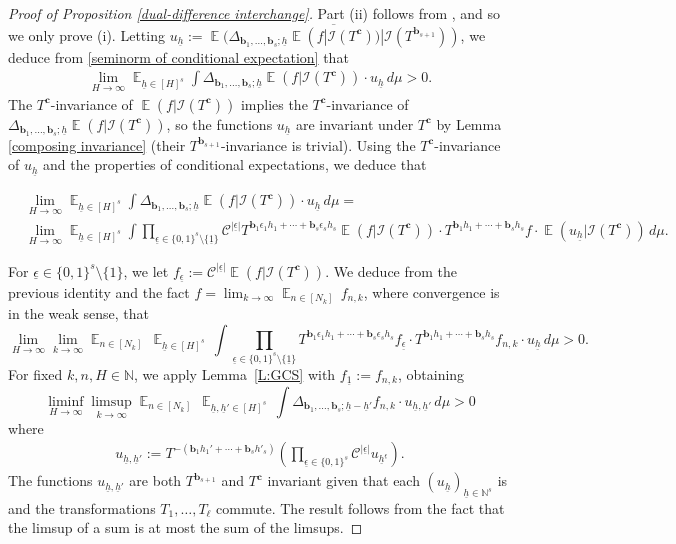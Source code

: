 \documentclass[11pt]{amsart}
\theoremstyle{definition}
\newcommand{\N}{{\mathbb N}}
\newcommand{\CC}{{\mathcal C}}
\newcommand{\CI}{{\mathcal I}}
\newcommand{\bc}{{\mathbf{c}}}
\renewcommand{\b}{{\textbf{b}}}
\newcommand{\uh}{{\underline{h}}}
\newcommand{\eps}{\epsilon}
\newcommand{\ueps}{{\underline{\epsilon}}}
\DeclareMathOperator*{\E}{\mathbb{E}}
\begin{document}
\begin{proof}[Proof of Proposition \ref{dual-difference interchange}]
Part (ii) follows from \cite[Proposition 5.7]{FrKu22}, and so we only prove (i). Letting $u_\uh := \overline{\E(\Delta_{{\b_1}, \ldots, {\b_{s}}; \uh}\E(f|\CI(T^\bc))|\CI(T^{\b_{s+1}}))}$, we deduce from \eqref{seminorm of conditional expectation} that
\begin{align*}
    \lim_{H\to\infty}\E_{\uh\in [H]^s} \int  \Delta_{{\b_1}, \ldots, {\b_{s}}; \uh}\E(f|\CI(T^\bc)) \cdot u_\uh\, d\mu > 0.
\end{align*}
The $T^\bc$-invariance of $\E(f|\CI(T^\bc))$ implies the $T^\bc$-invariance of $\Delta_{{\b_1}, \ldots, {\b_{s}}; \uh}\E(f|\CI(T^\bc))$, so the functions $u_\uh$ are invariant under $T^\bc$ by Lemma \ref{composing invariance} (their $T^{\b_{s+1}}$-invariance is trivial). Using the $T^\bc$-invariance of $u_\uh$ and the properties of conditional expectations, we deduce that

\begin{align*}%
&\lim_{H\to\infty}\E_{\uh\in [H]^s} \int  \Delta_{{\b_1}, \ldots, {\b_{s}}; \uh}\E(f|\CI(T^\bc)) \cdot u_\uh\, d\mu=\\
& \lim_{H\to\infty}\E_{\uh\in [H]^s} \int  \prod\limits_{{\ueps}\in \{0,1\}^s\setminus\{\underline{1}\}}\mathcal{C}^{|{\ueps}|} T^{\b_1 \eps_1 h_1+\cdots+ \b_s \eps_s h_s}\E(f|\CI(T^\bc))\cdot T^{\b_1 h_1+\cdots+\b_s h_s}f \cdot \E(u_\uh|\CI(T^\bc))\, d\mu.
\end{align*}

For $\ueps\in\{0,1\}^s\setminus\{1\}$, we let $f_\ueps := \CC^{|\ueps|}\E(f|\CI(T^\bc))$.  We deduce from the previous identity and the fact    $f=\lim_{k\to\infty}\E_{n\in [N_k]}\, f_{n,k}$, where convergence is  in the weak sense, that
	$$
    \lim_{H\to\infty} \lim_{k\to\infty}\E_{n\in [N_k]}\, \E_{\uh\in  [H]^s}\,  \int \prod_{\ueps\in \{0,1\}^s\setminus \{\underline{1}\}} T^{\b_1 \eps_1 h_1+\cdots+ \b_s \eps_s h_s} f_\ueps \cdot T^{\b_1 h_1+\cdots+\b_s h_s} f_{n,k}\cdot u_\uh\, d\mu > 0.
	$$
For fixed $k,n, H\in \N$, we apply  Lemma~\ref{L:GCS} with $f_{\underline{1}}:= f_{n,k}$, obtaining
$$
    \liminf_{H\to\infty} \limsup_{k\to\infty}\E_{n\in [N_k]}\, \E_{\uh,\uh'\in  [H]^s}\,  \int\Delta_{\b_1, \ldots, \b_s; \uh-\uh'}f_{n,k} \cdot u_{\uh, \uh'} \, d\mu > 0
$$	
where
\begin{align*}
     u_{\uh, \uh'} := T^{-(\b_1 h_1'+\cdots+\b_s h'_s)}\left(\prod_{\ueps\in \{0,1\}^s}\mathcal{C}^{|\ueps|}u_{\uh^\ueps}\right).
\end{align*}
The functions $u_{\uh, \uh'}$ are both $T^{\b_{s+1}}$ and $T^{\bc}$ invariant given that each $(u_\uh)_{\uh\in\N^s}$ is and the transformations $T_1,\ldots, T_\ell$ commute. The result follows from the fact that the limsup of a sum is at most the sum  of the limsups.
\end{proof}
\end{document}
